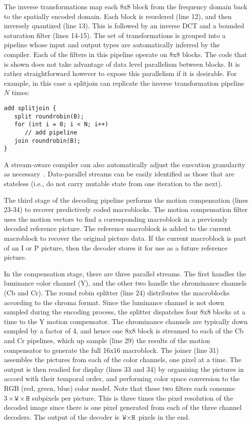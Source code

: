 The inverse transformations map each 8x8 block from the frequency
domain back to the spatially encoded domain. Each block is reordered
(line 12), and then inversely quantized (line 13). This is followed by
an inverse DCT and a bounded saturation filter (lines 14-15). The set
of transformations is grouped into a pipeline whose input
and output types are automatically inferred by the compiler. Each of
the filters in this pipeline operate on 8x8 blocks. The code that is
shown does not take advantage of data level parallelism between
blocks. It is rather straightforward however to expose this
parallelism if it is desirable. For example, in this case a splitjoin
can replicate the inverse transformation pipeline $N$ times:
\begin{center}
\begin{verbatim}
add splitjoin {
   split roundrobin(B);
   for (int i = 0; i < N; i++) 
      // add pipeline
   join roundrobin(B);
}
\end{verbatim}
\end{center}
A stream-aware compiler can also automatically adjust the execution
granularity as necessary~\cite{gordo-asplos}.  Data-parallel streams
can be easily identified as those that are stateless (i.e., do not
carry mutable state from one iteration to the next).

The third stage of the decoding pipeline performs the motion
compensation (lines 23-34) to recover predictively coded
macroblocks. The motion compensation filter uses the motion vectors to
find a corresponding macroblock in a previously decoded reference
picture. The reference macroblock is added to the current macroblock
to recover the original picture data. If the current macroblock is
part of an I or P picture, then the decoder stores it for use as a
future reference picture.

In the compensation stage, there are three parallel streams. 
The first handles the luminance color channel (Y), and the
other two handle the chrominance channels (Cb and Cr). The round robin
splitter (line 24) distributes the macroblocks according to the chroma
format. Since the luminance channel is not down sampled during the
encoding process, the splitter dispatches four 8x8 blocks at a time to
the Y motion compensator. The chrominance channels are typically down
sampled by a factor of 4, and hence one 8x8 block is streamed to each
of the Cb and Cr pipelines, which up sample (line 29) the results of
the motion compensator to generate the full 16x16 macroblock.  The
joiner (line 31) assembles the pictures from each of the color
channels, one pixel at a time. The output is then readied for display
(lines 33 and 34) by organizing the pictures in accord with their
temporal order, and performing color space conversion to the RGB (red,
green, blue) color model. Note that these two filters each consume
$3\times\texttt{W}\times\texttt{H}$ subpixels per picture. This is three
times the pixel resolution of the decoded image since there is one
pixel generated from each of the three channel decoders. The output of
the decoder is $\texttt{W}\times\texttt{H}$ pixels in the end.

